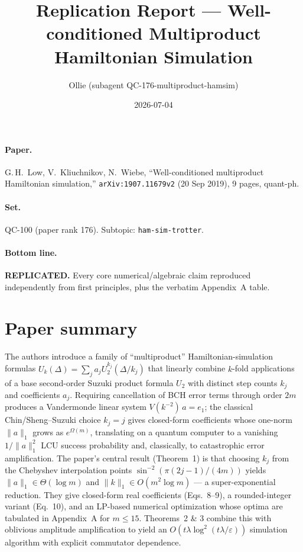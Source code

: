 \documentclass[11pt]{article}
\title{Replication Report --- Well-conditioned Multiproduct Hamiltonian Simulation}
\author{Ollie (subagent QC-176-multiproduct-hamsim)}
\date{2026-07-04}
\begin{document}
\maketitle

\paragraph{Paper.} G.\,H.~Low, V.~Kliuchnikov, N.~Wiebe, ``Well-conditioned multiproduct Hamiltonian simulation,'' \texttt{arXiv:1907.11679v2} (20 Sep 2019), 9 pages, quant-ph.

\paragraph{Set.} QC-100 (paper rank 176). Subtopic: \texttt{ham-sim-trotter}.

\paragraph{Bottom line.} \textbf{REPLICATED.} Every core numerical/algebraic claim reproduced independently from first principles, plus the verbatim Appendix~A table.

\section{Paper summary}

The authors introduce a family of ``multiproduct'' Hamiltonian-simulation formulas
$U_k(\Delta) = \sum_j a_j U_2^{k_j}(\Delta/k_j)$ that linearly combine $k$-fold applications of a base second-order Suzuki product formula $U_2$ with distinct step counts $k_j$ and coefficients $a_j$. Requiring cancellation of BCH error terms through order $2m$ produces a Vandermonde linear system $V(k^{-2})\,a = e_1$; the classical Chin/Sheng--Suzuki choice $k_j = j$ gives closed-form coefficients whose one-norm $\|a\|_1$ grows as $e^{\Omega(m)}$, translating on a quantum computer to a vanishing $1/\|a\|_1^2$ LCU success probability and, classically, to catastrophic error amplification. The paper's central result (Theorem~1) is that choosing $k_j$ from the Chebyshev interpolation points $\sin^{-2}(\pi(2j-1)/(4m))$ yields $\|a\|_1 \in \Theta(\log m)$ and $\|k\|_1 \in O(m^2 \log m)$ --- a super-exponential reduction. They give closed-form real coefficients (Eqs.~8--9), a rounded-integer variant (Eq.~10), and an LP-based numerical optimization whose optima are tabulated in Appendix~A for $m \leq 15$. Theorems~2 \& 3 combine this with oblivious amplitude amplification to yield an $O(t\lambda \log^2(t\lambda/\varepsilon))$ simulation algorithm with explicit commutator dependence.
\end{document}
